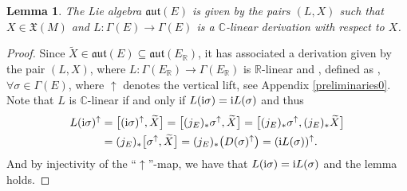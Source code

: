 \documentclass[pdftex]{sigma}
\numberwithin{equation}{section}
\newtheorem{Lemma}[Theorem]{Lemma}
\newcommand{\R}{{\mathbb{R}}}
\newcommand{\C}{{\mathbb{C}}}
\newcommand{\X}{\mathfrak{X}}
\newcommand{\aut}{\mathfrak{aut}}
\DeclareMathOperator{\pr}{pr}
\begin{document}
 \begin{Lemma} The Lie algebra $\mathfrak{aut}(E)$ is given by the pairs $(L,X)$ such that $X\in \mathfrak{X}(M)$ and $L\colon \Gamma (E)\to \Gamma (E)$ is a $\C$-linear derivation with respect to $X$.
 \end{Lemma}
\begin{proof}
Since $\widetilde{X}\in \aut(E)\subseteq \aut (E_{\R})$, it has associated a derivation given by the pair $(L, X)$, where $L\colon \Gamma(E_{\R})\to \Gamma(E_{\R})$ is $\R$-linear and \smash{$X=\pr_* \widetilde{X}\in \X(M)$}, defined as , ${\forall \sigma\in \Gamma(E)}$, where $\uparrow$ denotes the vertical lift, see Appendix \ref{preliminaries0}. Note that $L$ is $\C$-linear if and only if $L({\rm i}\sigma)={\rm i}L(\sigma)$ and thus
\begin{align*}
L({\rm i}\sigma)^{\uparrow}&{}=\bigl[({\rm i}\sigma)^{\uparrow}, \widetilde{X}\bigr]=\bigl[(j_{E})_* \sigma^{\uparrow}, \widetilde{X}\bigr]=\bigl[(j_{E})_* \sigma^{\uparrow},(j_{E})_* \widetilde{X}\bigr]\\
&{}=(j_E)_* \bigl[\sigma^{\uparrow}, \widetilde{X}\bigr]=(j_{E})_* \bigl(D(\sigma)^{\uparrow}\bigr)=({\rm i}L(\sigma))^{\uparrow}.
\end{align*}
And by injectivity of the ``$\uparrow$''-map, we have that $L({\rm i}\sigma)={\rm i}L(\sigma)$ and the lemma holds.
\end{proof}
\end{document}
